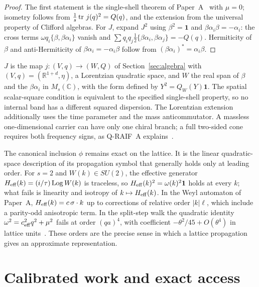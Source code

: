 \begin{proof}
The first statement is the single-shell theorem of Paper~A~\cite{Liu2026QRAIF_A} with $\mu=0$; isometry follows from $\tfrac1s\operatorname{tr}\,j(q)^2=Q(q)$, and the extension from the universal property of Clifford algebras. For $J$, expand $J^2$ using $\beta^2=\mathbf 1$ and $\beta\alpha_i\beta=-\alpha_i$: the cross terms $\omega q_i\{\beta,\beta\alpha_i\}$ vanish and $\sum q_iq_j\tfrac12\{\beta\alpha_i,\beta\alpha_j\}=-Q(q)$. Hermiticity of $\beta$ and anti-Hermiticity of $\beta\alpha_i=-\alpha_i\beta$ follow from $(\beta\alpha_i)^*=\alpha_i\beta$.
\end{proof}

$J$ is the map $j:(V,q)\to(W,Q)$ of Section~\ref{sec:algebra} with $(V,q)=(\mathbb R^{1+d},\eta)$, a Lorentzian quadratic space, and $W$ the real span of $\beta$ and the $\beta\alpha_i$ in $M_s(\mathbb C)$, with the form defined by $Y^2=Q_W(Y)\mathbf 1$. The spatial scalar-square condition is equivalent to the specified single-shell property, so no internal band has a different squared dispersion. The Lorentzian extension additionally uses the time parameter and the mass anticommutator. A massless one-dimensional carrier can have only one chiral branch; a full two-sided cone requires both frequency signs, as Q-RAIF~A explains~\cite{Liu2026QRAIF_A}.

The canonical inclusion $\phi$ remains exact on the lattice. It is the linear quadratic-space description of its propagation symbol that generally holds only at leading order. For $s=2$ and $W(k)\in SU(2)$, the effective generator $H_{\rm eff}(k)=(i/\tau)\operatorname{Log}W(k)$ is traceless, so $H_{\rm eff}(k)^2=\omega(k)^2\mathbf 1$ holds at every $k$; what fails is linearity and isotropy of $k\mapsto H_{\rm eff}(k)$. In the Weyl automaton of Paper~A, $H_{\rm eff}(k)=c\,\sigma\cdot k$ up to corrections of relative order $|k|\ell$, which include a parity-odd anisotropic term. In the split-step walk the quadratic identity $\omega^2=c_{\rm eff}^2q^2+\mu^2$ fails at order $(qa)^4$, with coefficient $-\theta^2/45+O(\theta^4)$ in lattice units~\cite{Liu2026QRAIF_ME}. These orders are the precise sense in which a lattice propagation gives an approximate representation.


\section{Calibrated work and exact access}
\label{sec:charge-shell}

